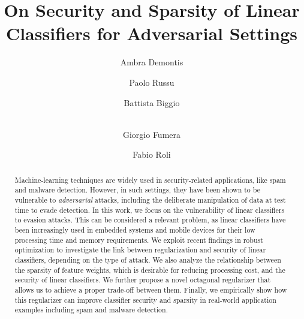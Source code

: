 \documentclass[runningheads,a4paper]{llncs}
\begin{document}
\mainmatter  %

\title{On Security and Sparsity of Linear Classifiers for Adversarial Settings}


\author{Ambra Demontis
\and Paolo Russu\and Battista Biggio\and\\
 Giorgio Fumera\and Fabio Roli}
%



\maketitle

\newcommand{\oc}{$8$-\emph{gon}}

\begin{abstract}
Machine-learning techniques are widely used in security-related applications, like spam and malware detection.
However, in such settings, they have been shown to be vulnerable to \emph{adversarial} attacks, including the deliberate manipulation of data at test time to evade detection.
In this work, we focus on the vulnerability of linear classifiers to evasion attacks. 
This can be considered a relevant problem, as linear classifiers have been increasingly used in embedded systems and mobile devices for their low processing time and memory requirements. 
We exploit recent findings in robust optimization to investigate the link between regularization and security of linear classifiers, depending on the type of attack. 
We also analyze the relationship between the sparsity of feature weights, which is desirable for reducing processing cost, and the security of linear classifiers. We further propose a novel octagonal regularizer that allows us to achieve a proper trade-off between them.
Finally, we empirically show how this regularizer can improve classifier security and sparsity in real-world application examples including spam and malware detection.
\end{abstract}
\end{document}
